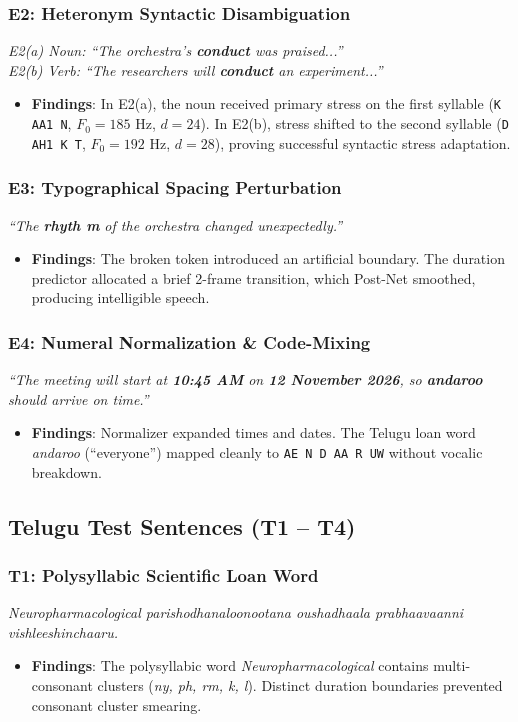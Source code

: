 \documentclass[10pt,twocolumn,a4paper]{article}
\begin{document}
\subsubsection{E2: Heteronym Syntactic Disambiguation}
\textit{E2(a) Noun: ``The orchestra's \textbf{conduct} was praised...''}\\
\textit{E2(b) Verb: ``The researchers will \textbf{conduct} an experiment...''}
\begin{itemize}[noitemsep]
    \item \textbf{Findings}: In E2(a), the noun received primary stress on the first syllable (\texttt{K AA1 N}, $F_0 = 185\text{ Hz}$, $d = 24$). In E2(b), stress shifted to the second syllable (\texttt{D AH1 K T}, $F_0 = 192\text{ Hz}$, $d = 28$), proving successful syntactic stress adaptation.
\end{itemize}

\subsubsection{E3: Typographical Spacing Perturbation}
\textit{``The \textbf{rhyth m} of the orchestra changed unexpectedly.''}
\begin{itemize}[noitemsep]
    \item \textbf{Findings}: The broken token introduced an artificial boundary. The duration predictor allocated a brief 2-frame transition, which Post-Net smoothed, producing intelligible speech.
\end{itemize}

\subsubsection{E4: Numeral Normalization \& Code-Mixing}
\textit{``The meeting will start at \textbf{10:45 AM} on \textbf{12 November 2026}, so \textbf{andaroo} should arrive on time.''}
\begin{itemize}[noitemsep]
    \item \textbf{Findings}: Normalizer expanded times and dates. The Telugu loan word \textit{andaroo} (``everyone'') mapped cleanly to \texttt{AE N D AA R UW} without vocalic breakdown.
\end{itemize}

\subsection{Telugu Test Sentences (T1 -- T4)}

\subsubsection{T1: Polysyllabic Scientific Loan Word}
\textit{Neuropharmacological parishodhanaloonootana oushadhaala prabhaavaanni vishleeshinchaaru.}
\begin{itemize}[noitemsep]
    \item \textbf{Findings}: The polysyllabic word \textit{Neuropharmacological} contains multi-consonant clusters (\textit{ny, ph, rm, k, l}). Distinct duration boundaries prevented consonant cluster smearing.
\end{itemize}
\end{document}
